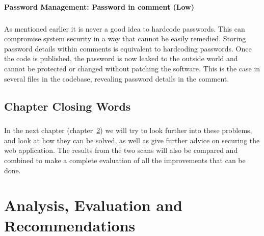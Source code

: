 \documentclass[11pt,english,a4paper]{report}
\begin{document}
\subsubsection{Password Management: Password in comment (Low)}
\paragraph{}
As mentioned earlier it is never a good idea to hardcode passwords. 
This can compromise system security in a way that cannot be easily remedied.
Storing password details within comments is equivalent to hardcoding passwords.
Once the code is published, the password is now leaked to the outside world and cannot be protected or changed without patching the software. 
This is the case in several files in the codebase, revealing password details in the comment.


\section{Chapter Closing Words}
\paragraph{}
In the next chapter (chapter~\ref{cha:part4}) we will try to look further into these problems, and look at how they can be solved, as well as give further advice on securing the web application.
The results from the two scans will also be compared and combined to make a complete evaluation of all the improvements that can be done.


\chapter{Analysis, Evaluation and Recommendations}
\label{cha:part4}
\newpage




\end{document}
